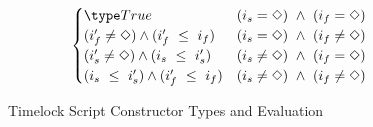 \begin{figure*}[htb]
\begin{align*}
\begin{cases}
      \True & (i_s = \Nothing)~\wedge~(i_f = \Nothing) \\
      (i_f' \neq \Nothing) \wedge (i_f'~\leq~i_f) & (i_s = \Nothing)~\wedge~(i_f \neq \Nothing) \\
      (i_s' \neq \Nothing) \wedge (i_s~\leq~i_s') & (i_s \neq \Nothing)~\wedge~(i_f = \Nothing)\\
      (i_s~\leq~i_s') \wedge (i_f'~\leq~i_f) & (i_s \neq \Nothing)~\wedge~(i_f \neq \Nothing)
    \end{cases} \\
  \end{align*}
  \caption{Timelock Script Constructor Types and Evaluation}
  \label{fig:defs:tx-mc-eval}
\end{figure*}

%
%
